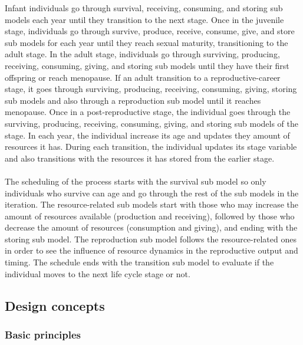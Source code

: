\documentclass{article}
\begin{document}
Infant individuals go through survival, receiving, consuming, and storing sub models each year until they transition to the next stage. Once in the juvenile stage, individuals go through survive, produce, receive, consume, give, and store sub models for each year until they reach sexual maturity, transitioning to the adult stage. In the adult stage, individuals go through surviving, producing, receiving, consuming, giving, and storing sub models until they have their first offspring or reach menopause. If an adult transition to a reproductive-career stage, it goes through surviving, producing, receiving, consuming, giving, storing sub models and also through a reproduction sub model until it reaches menopause. Once in a post-reproductive stage, the individual goes through the surviving, producing, receiving, consuming, giving, and storing sub models of the stage. In each year, the individual increase its age and updates they amount of resources it has. During each transition, the individual updates its stage variable and also transitions with the resources it has stored from the earlier stage.
\\\\
The scheduling of the process starts with the survival sub model so only individuals who survive can age and go through the rest of the sub models in the iteration. The resource-related sub models start with those who may increase the amount of resources available (production and receiving), followed by those who decrease the amount of resources (consumption and giving), and ending with the storing sub model. The reproduction sub model follows the resource-related ones in order to see the influence of resource dynamics in the reproductive output and timing. The schedule ends with the transition sub model to evaluate if the individual moves to the next life cycle stage or not.

\subsection{Design concepts}

\subsubsection{Basic principles}
\end{document}
